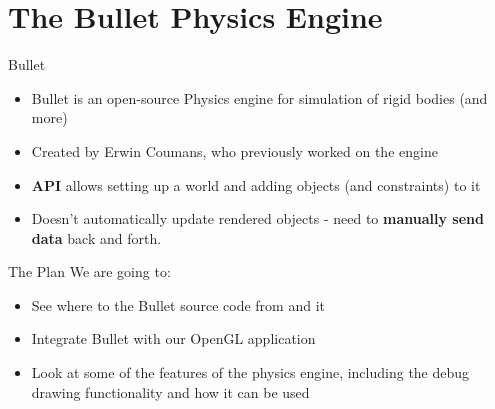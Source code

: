 \part{The Bullet Physics Engine}
\frame{\partpage}

\begin{frame}{Bullet}
	\begin{itemize}
		\pause\item Bullet is an open-source Physics engine for simulation of rigid bodies (and more)
		\pause\item Created by Erwin Coumans, who previously worked on the \href{https://www.havok.com/havok-physics/}{\color{cyan}{Havok}} engine
		\pause\item \textbf{API} allows setting up a world and adding objects (and constraints) to it
		\pause\item Doesn't automatically update rendered objects - need to \textbf{manually send data} back and forth.
	\end{itemize}
\end{frame}

\begin{frame}{The Plan}
	We are going to:
	\begin{itemize}
		\pause\item See where to \href{http://bulletphysics.org/}{\color{cyan}{download}} the Bullet source code from and \href{https://github.com/bulletphysics/bullet3/blob/master/README.md}{\color{cyan}{how to compile}} it
		\pause\item Integrate Bullet with our OpenGL application
		\pause\item Look at some of the features of the physics engine, including the debug drawing functionality and how it can be used
	\end{itemize}
\end{frame}

